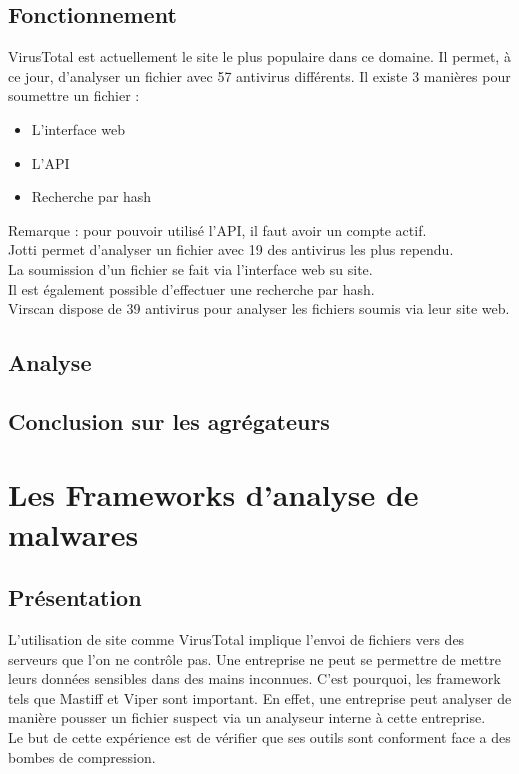 \documentclass[smallextended]{svjour3}       %
\begin{document}
\subsection{Fonctionnement}
\label{agrégateurs:fonctionnement}
VirusTotal est actuellement le site le plus populaire dans ce domaine. Il permet, à ce jour, d'analyser un fichier avec 57 antivirus différents. Il existe 3 manières pour soumettre un fichier :
\begin{itemize}
\item L'interface web
\item L'API
\item Recherche par hash
\end{itemize}
Remarque : pour pouvoir utilisé l'API, il faut avoir un compte actif.\\
$ $\\
Jotti permet d'analyser un fichier avec 19 des antivirus les plus rependu.\\
La soumission d'un fichier se fait via l'interface web su site.\\
Il est également possible d'effectuer une recherche par hash.\\
$ $\\
Virscan dispose de 39 antivirus pour analyser les fichiers  soumis via leur site web.
\subsection{Analyse}
\label{agrégateurs:analyse}

\subsection{Conclusion sur les agrégateurs}
\label{agrégateurs:conclusion}

\newpage
\section{Les Frameworks d'analyse de malwares}
\label{sec3:frameworks}

\subsection{Présentation}
\label{frameworks:présentation}
L'utilisation de site comme VirusTotal implique l'envoi de fichiers vers des serveurs que l'on ne contrôle pas. Une entreprise ne peut se permettre de mettre leurs données sensibles dans des mains inconnues. C'est pourquoi, les framework tels que Mastiff et Viper sont important. En effet, une entreprise peut analyser de manière pousser un fichier suspect via un analyseur interne à cette entreprise.\\
Le but de cette expérience est de vérifier que ses outils sont conforment face a des bombes de compression.
\end{document}

